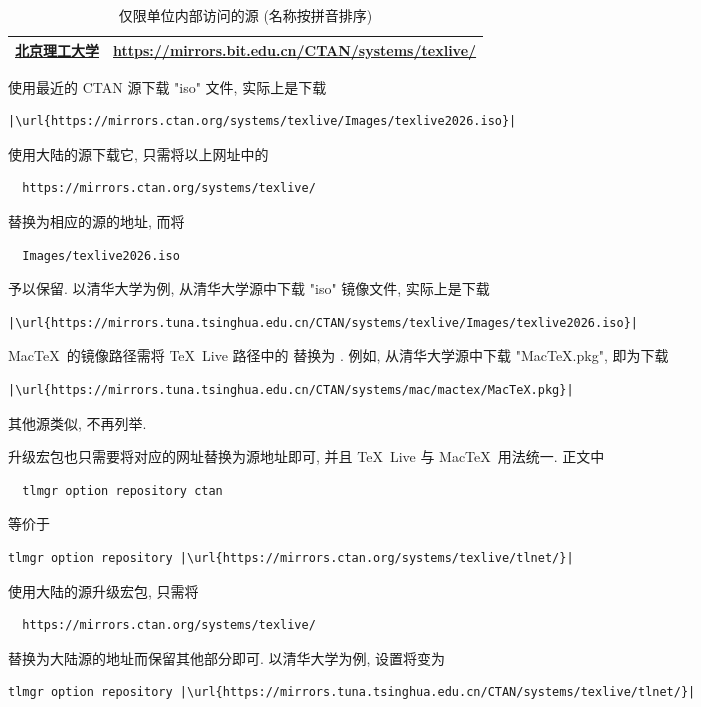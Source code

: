 \begin{table}
  \centering
  \caption{仅限单位内部访问的源 (名称按拼音排序)}\label{tab:appendix:mirror-self}
  \begin{tabular}{p{8\ccwd}p{58\ttwd}}
    \hline\hline
    \href{https://mirrors.bit.edu.cn/web/}{北京理工大学}
    & \url{https://mirrors.bit.edu.cn/CTAN/systems/texlive/}\\
    \hline\hline
  \end{tabular}
\end{table}

使用最近的 CTAN 源下载 "iso" 文件,
实际上是下载
\begin{lstlisting}[escapechar = |]
  |\url{https://mirrors.ctan.org/systems/texlive/Images/texlive2026.iso}|
\end{lstlisting}
使用大陆的源下载它,
只需将以上网址中的
\begin{lstlisting}
  https://mirrors.ctan.org/systems/texlive/
\end{lstlisting}
替换为相应的源的地址,
而将
\begin{lstlisting}
  Images/texlive2026.iso
\end{lstlisting}
予以保留.
以清华大学为例,
从清华大学源中下载 "iso" 镜像文件,
实际上是下载
\begin{lstlisting}[escapechar = |]
  |\url{https://mirrors.tuna.tsinghua.edu.cn/CTAN/systems/texlive/Images/texlive2026.iso}|
\end{lstlisting}
Mac\TeX\ 的镜像路径需将 \TeX~Live 路径中的  替换为 .
例如, 从清华大学源中下载 "MacTeX.pkg",
即为下载
\begin{lstlisting}[escapechar = |]
  |\url{https://mirrors.tuna.tsinghua.edu.cn/CTAN/systems/mac/mactex/MacTeX.pkg}|
\end{lstlisting}
其他源类似,
不再列举.

升级宏包也只需要将对应的网址替换为源地址即可,
并且 \TeX~Live 与 Mac\TeX\ 用法统一.
正文中
\begin{lstlisting}
  tlmgr option repository ctan
\end{lstlisting}
等价于
\begin{lstlisting}[escapechar = |]
  tlmgr option repository |\url{https://mirrors.ctan.org/systems/texlive/tlnet/}|
\end{lstlisting}
使用大陆的源升级宏包,
只需将
\begin{lstlisting}
  https://mirrors.ctan.org/systems/texlive/
\end{lstlisting}
替换为大陆源的地址而保留其他部分即可.
以清华大学为例,
设置将变为
\begin{lstlisting}[escapechar = |]
  tlmgr option repository |\url{https://mirrors.tuna.tsinghua.edu.cn/CTAN/systems/texlive/tlnet/}|
\end{lstlisting}
